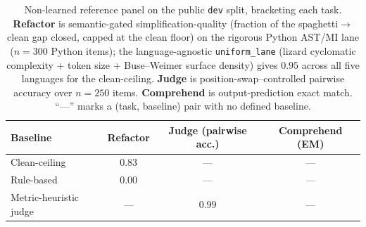 \begin{table}[t]
\centering
\caption{Non-learned reference panel on the public \texttt{dev} split, bracketing each
task. \textbf{Refactor} is semantic-gated simplification-quality (fraction of the
spaghetti$\rightarrow$clean gap closed, capped at the clean floor) on the rigorous Python
AST/MI lane ($n{=}300$ Python items); the language-agnostic \texttt{uniform\_lane} (lizard
cyclomatic complexity + token size + Buse--Weimer surface density) gives $0.95$ across all
five languages for the clean-ceiling. \textbf{Judge} is position-swap--controlled pairwise
accuracy over $n{=}250$ items. \textbf{Comprehend} is output-prediction exact match.
``---'' marks a (task, baseline) pair with no defined baseline.}
\label{tab:baselines}
\begin{tabular}{@{}lccc@{}}
\toprule
Baseline & Refactor & Judge (pairwise acc.) & Comprehend (EM) \\
\midrule
Clean-ceiling          & $0.83$ & ---    & ---    \\
Rule-based             & $0.00$ & ---    & ---    \\
Metric-heuristic judge & ---    & $0.99$ & ---    \\
\bottomrule
\end{tabular}
\end{table}

